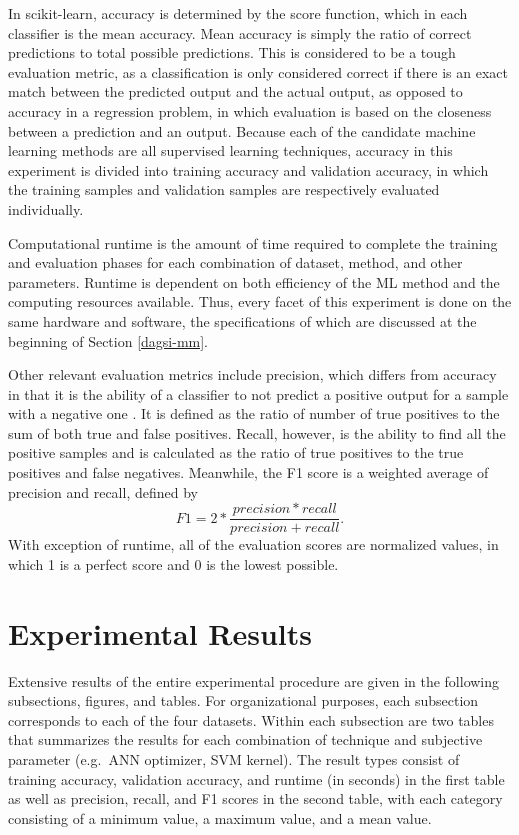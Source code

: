 \documentclass[12pt]{uthesis-v12}  %
\begin{document}
In scikit-learn, accuracy is determined by the score function, which in each classifier is the mean accuracy. Mean accuracy is simply the ratio of correct predictions to total possible predictions. This is considered to be a tough evaluation metric, as a classification is only considered correct if there is an exact match between the predicted output and the actual output, as opposed to accuracy in a regression problem, in which evaluation is based on the closeness between a prediction and an output. Because each of the candidate machine learning methods are all supervised learning techniques, accuracy in this experiment is divided into training accuracy and validation accuracy, in which the training samples and validation samples are respectively evaluated individually.

Computational runtime is the amount of time required to complete the training and evaluation phases for each combination of dataset, method, and other parameters. Runtime is dependent on both efficiency of the ML method and the computing resources available. Thus, every facet of this experiment is done on the same hardware and software, the specifications of which are discussed at the beginning of Section \ref{dagsi-mm}.

Other relevant evaluation metrics include precision, which differs from accuracy in that it is the ability of a classifier to not predict a positive output for a sample with a negative one \cite{pedregosa}. It is defined as the ratio of number of true positives to the sum of both true and false positives. Recall, however, is the ability to find all the positive samples and is calculated as the ratio of true positives to the true positives and false negatives. Meanwhile, the F1 score is a weighted average of precision and recall, defined by
\begin{equation}
F1 = 2 * \frac{precision * recall}{precision + recall}.
\end{equation}
With exception of runtime, all of the evaluation scores are normalized values, in which 1 is a perfect score and 0 is the lowest possible.

\section{Experimental Results}
\label{dagsi-results}

Extensive results of the entire experimental procedure are given in the following subsections, figures, and tables. For organizational purposes, each subsection corresponds to each of the four datasets. Within each subsection are two tables that summarizes the results for each combination of technique and subjective parameter (e.g.~ANN optimizer, SVM kernel). The result types consist of training accuracy, validation accuracy, and runtime (in seconds) in the first table as well as precision, recall, and F1 scores in the second table, with each category consisting of a minimum value, a maximum value, and a mean value. 
\end{document}
